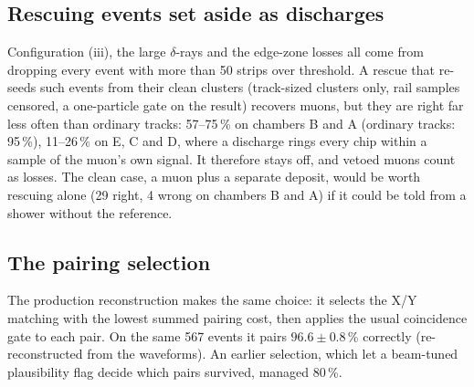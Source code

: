 \subsection{Rescuing events set aside as discharges}
Configuration (iii), the large $\delta$-rays and the edge-zone losses all come from
dropping every event with more than 50 strips over threshold. A rescue that re-seeds such events from their clean
clusters (track-sized clusters only, rail samples censored, a one-particle gate on the result) recovers muons, but they
are right far less often than ordinary tracks: 57--75\,\% on chambers B and A (ordinary tracks: 95\,\%), 11--26\,\% on E, C and D, where a
discharge rings every chip within a sample of the muon's own signal. It therefore stays off, and vetoed muons count as
losses. The clean case, a muon plus a separate deposit,
would be worth rescuing alone (29 right, 4 wrong on chambers B and A) if it could be told from a shower without the reference.

\subsection{The pairing selection}
The production reconstruction makes the same choice: it selects the X/Y matching with the lowest summed pairing
cost, then applies the usual coincidence gate to each pair. On the same 567 events it pairs $96.6\pm0.8$\,\% correctly
(re-reconstructed from the waveforms). An earlier selection,
which let a beam-tuned plausibility flag decide which pairs survived, managed 80\,\%.

